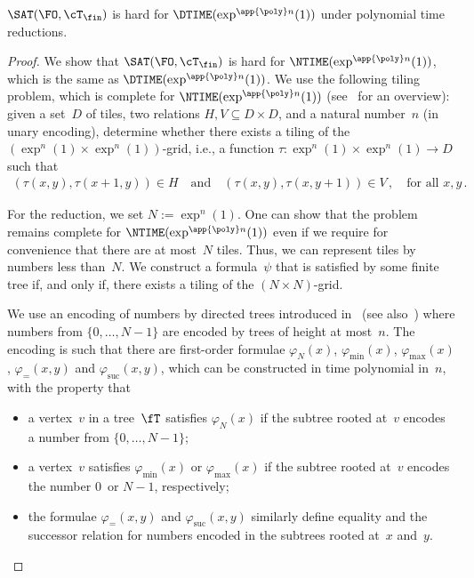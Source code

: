 \documentclass{LMCS}
\begin{document}
\begin{prop}\label{Prop: SAT(FO,Tfin) hard}
$\SAT(\FO,\cT_\fin)$ is hard for $\DTIME(\exp^{\app{\poly}n}(1))$
under polynomial time reductions.
\end{prop}
\begin{proof}
We show that $\SAT(\FO,\cT_\fin)$ is hard for $\NTIME(\exp^{\app{\poly}n}(1))$,
which is the same as $\DTIME(\exp^{\app{\poly}n}(1))$.
We use the following tiling problem, which is complete for
$\NTIME(\exp^{\app{\poly}n}(1))$ (see~\cite{Harel85} for an overview)\?:
given a set~$D$ of tiles, two relations $H,V \subseteq D \times D$, and
a natural number~$n$ (in unary encoding), determine whether there exists a tiling
of the $(\exp^n(1)\times \exp^n(1))$-grid, i.e., a function
$\tau : \exp^n(1)\times \exp^n(1) \to D$ such that
\begin{align*}
  (\tau(x,y),\tau(x+1,y)) \in H
  \quad\text{and}\quad
  (\tau(x,y),\tau(x,y+1)) \in V\,,
  \quad\text{for all } x,y\,.
\end{align*}

For the reduction, we set $N := \exp^n(1)$.
One can show that the problem remains complete for
$\NTIME(\exp^{\app{\poly}n}(1))$
even if we require for convenience that there are at most~$N$ tiles.
Thus, we can represent tiles by numbers less than~$N$.
We construct a formula~$\psi$ that is satisfied by some finite tree
if, and only if, there exists a tiling of the $(N \times N)$-grid.

We use an encoding of numbers by directed trees
introduced in~\cite{FlumGrohe06} (see also~\cite{DawarGrKrSchw07})
where numbers from $\{0,\dots,N-1\}$ are encoded by trees of height at most~$n$.
The encoding is such that there are first-order formulae
$\varphi_N(x)$, $\varphi_{\min}(x)$, $\varphi_{\max}(x)$,
$\varphi_=(x,y)$ and $\varphi_{\mathrm{suc}}(x,y)$,
which can be constructed in time polynomial in~$n$,
with the property that
\begin{itemize}
\item a vertex~$v$ in a tree~$\fT$ satisfies $\varphi_N(x)$ if the
  subtree rooted at~$v$ encodes a number from $\{0,\dots,N-1\}$\?;
\item a vertex~$v$ satisfies $\varphi_{\min}(x)$ or $\varphi_{\max}(x)$
  if the subtree rooted at~$v$ encodes the number $0$~or $N-1$, respectively\?;
\item the formulae $\varphi_=(x,y)$ and $\varphi_{\mathrm{suc}}(x,y)$
  similarly define equality and the successor relation for numbers
  encoded in the subtrees rooted at~$x$ and~$y$.
\end{itemize}


\end{proof}
\end{document}
